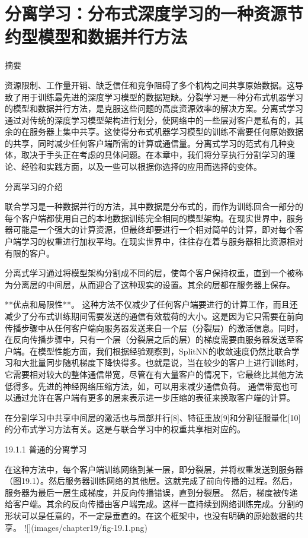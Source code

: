 \chapter{分离学习：分布式深度学习的一种资源节约型模型和数据并行方法}

摘要

资源限制、工作量开销、缺乏信任和竞争阻碍了多个机构之间共享原始数据。这导致了用于训练最先进的深度学习模型的数据短缺。分裂学习是一种分布式机器学习的模型和数据并行方法，是克服这些问题的高度资源效率的解决方案。分离式学习通过对传统的深度学习模型架构进行划分，使网络中的一些层对客户是私有的，其余的在服务器上集中共享。这使得分布式机器学习模型的训练不需要任何原始数据的共享，同时减少任何客户端所需的计算或通信量。分离式学习的范式有几种变体，取决于手头正在考虑的具体问题。在本章中，我们将分享执行分割学习的理论、经验和实践方面，以及一些可以根据你选择的应用而选择的变体。

分离学习的介绍

联合学习是一种数据并行的方法，其中数据是分布式的，而作为训练回合一部分的每个客户端都使用自己的本地数据训练完全相同的模型架构。在现实世界中，服务器可能是一个强大的计算资源，但最终却要进行一个相对简单的计算，即对每个客户端学习的权重进行加权平均。在现实世界中，往往存在着与服务器相比资源相对有限的客户。

分离式学习通过将模型架构分割成不同的层，使每个客户保持权重，直到一个被称为分离层的中间层，从而迎合了这种现实的设置。其余的层都在服务器上保存。

**优点和局限性**。 这种方法不仅减少了任何客户端要进行的计算工作，而且还减少了分布式训练期间需要发送的通信有效载荷的大小。这是因为它只需要在前向传播步骤中从任何客户端向服务器发送来自一个层（分裂层）的激活信息。同时，在反向传播步骤中，只有一个层（分裂层之后的层）的梯度需要由服务器发送至客户端。在模型性能方面，我们根据经验观察到，SplitNN的收敛速度仍然比联合学习和大批量同步随机梯度下降快得多。也就是说，当在较少的客户上进行训练时，它需要相对较大的整体通信带宽，尽管在有大量客户的情况下，它最终比其他方法低得多。先进的神经网络压缩方法，如，可以用来减少通信负荷。
通信带宽也可以通过允许在客户端有更多的层来表示进一步压缩的表征来换取客户端的计算。

在分割学习中共享中间层的激活也与局部并行[8]、特征重放[9]和分割征服量化[10]的分布式学习方法有关。这是与联合学习中的权重共享相对应的。

19.1.1 普通的分离学习

在这种方法中，每个客户端训练网络到某一层，即分裂层，并将权重发送到服务器（图19.1）。然后服务器训练网络的其他层。这就完成了前向传播的过程。然后，服务器为最后一层生成梯度，并反向传播错误，直到分裂层。
然后，梯度被传递给客户端。其余的反向传播由客户端完成。这样一直持续到网络训练完成。分割的形状可以是任意的，不一定是垂直的。在这个框架中，也没有明确的原始数据的共享。
![](images/chapter19/fig-19.1.png)

